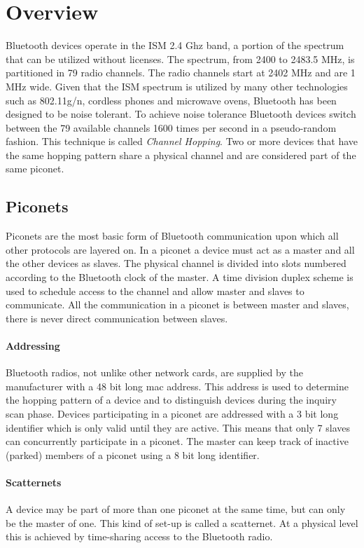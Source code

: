 \section{Overview}
Bluetooth devices operate in the ISM 2.4 Ghz \cite{ISM} band, a portion of the spectrum that can be utilized without licenses.
The spectrum, from 2400 to 2483.5 MHz, is partitioned in 79 radio channels.
The radio channels start at 2402 MHz and are 1 MHz wide.
Given that the ISM spectrum is utilized by many other technologies such as 802.11g/n, cordless phones and microwave ovens, Bluetooth has been designed to be noise tolerant. 
To achieve noise tolerance Bluetooth devices switch between the 79 available channels 1600 times per second in a pseudo-random fashion. This technique is called \emph{Channel Hopping}.
Two or more devices that have the same hopping pattern share a physical channel and are considered part of the same piconet.

\subsection{Piconets}
Piconets are the most basic form of Bluetooth communication upon which all other protocols are layered on.
In a piconet a device must act as a master and all the other devices as slaves.
The physical channel is divided into slots numbered according to the Bluetooth clock of the master.
A time division duplex scheme \cite{TDD} is used to schedule access to the channel and allow master and slaves to communicate.
All the communication in a piconet is between master and slaves, there is never direct communication between slaves.

\paragraph{Addressing}
Bluetooth radios, not unlike other network cards, are supplied by the manufacturer with a 48 bit long mac address.
This address is used to determine the hopping pattern of a device and to distinguish devices during the inquiry scan phase.
Devices participating in a piconet are addressed with a 3 bit long identifier which is only valid until they are active.
This means that only 7 slaves can concurrently participate in a piconet.
The master can keep track of inactive (parked) members of a piconet using a 8 bit long identifier.

\paragraph{Scatternets}
A device may be part of more than one piconet at the same time, but can only be the master of one. This kind of set-up is called a scatternet.
At a physical level this is achieved by time-sharing access to the Bluetooth radio.

